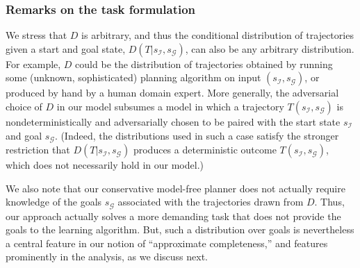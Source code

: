 \documentclass{article}
\newcommand{\MEMO}[1]
{ \fbox{
		\begin{minipage}[b]{7.9 cm}
			#1
		\end{minipage}
} }
\begin{document}
	\subsubsection{Remarks on the task formulation}
	We stress that $D$ is arbitrary, and thus  the conditional distribution
	of trajectories given a start and goal state, $D(T|s_{\mathcal{I}},s_{\mathcal{G}})$, can also be any arbitrary distribution. For example, $D$ could be the distribution of trajectories obtained
	by running some (unknown, sophisticated) planning algorithm on input $(s_{\mathcal{I}},s_{\mathcal{G}})$, or produced by hand by a human domain expert. 
	More generally, the adversarial choice of $D$ in our model subsumes a model in which a trajectory $T(s_{\mathcal{I}},s_{\mathcal{G}})$ is nondeterministically and adversarially chosen to
	be paired with the start state $s_{\mathcal{I}}$ and goal $s_{\mathcal{G}}$. 
	(Indeed, the distributions used in such a case satisfy the stronger restriction that $D(T|s_{\mathcal{I}},s_{\mathcal{G}})$ produces a deterministic outcome $T(s_{\mathcal{I}},s_{\mathcal{G}})$, which does not necessarily hold in our model.)
	
	We also note that our conservative model-free planner does not actually require knowledge of the goals $s_{\mathcal{G}}$ associated with the trajectories drawn from $D$. Thus, our approach actually solves a more demanding task that does not provide the goals to the learning algorithm. But, such a distribution over goals is nevertheless a central feature in our notion of ``approximate completeness,'' and features prominently in the analysis, as we discuss next.
	
\end{document}
